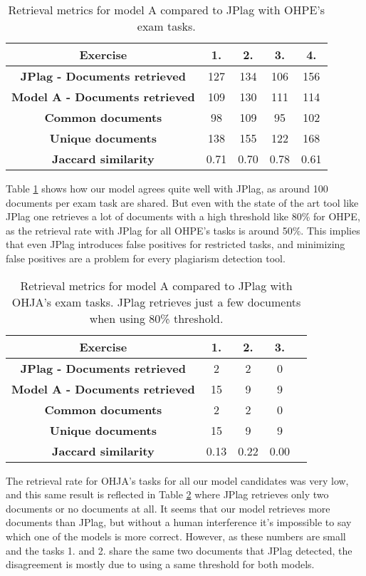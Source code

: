 \begin{table}[ht]
\centering
\caption{Retrieval metrics for model A compared to JPlag with OHPE's exam tasks.}
\begin{tabular}{|c||c|c|c|c|}
\hline
\bf Exercise & 1. & 2. & 3. & 4. \\ \hline
\bf JPlag - Documents retrieved & 127 & 134 & 106 & 156 \\ \hline
\bf Model A - Documents retrieved & 109 & 130 & 111 & 114\\ \hline
\bf Common documents & 98  & 109 & 95 & 102\\ \hline
\bf Unique documents & 138 & 155 & 122 & 168\\ \hline
\bf Jaccard similarity    & 0.71  & 0.70  & 0.78  & 0.61  \\ \hline
\end{tabular}
\label{tbl-jacc-sd-ohpe}
\end{table}

\noindent
Table \ref{tbl-jacc-sd-ohpe} shows how our model agrees quite well with JPlag, as around 100 documents per exam task are shared. But even with the state of the art tool like JPlag one retrieves a lot of documents with a high threshold like 80\% for OHPE, as the retrieval rate with JPlag for all OHPE's tasks is around 50\%. This implies that even JPlag introduces false positives for restricted tasks, and minimizing false positives are a problem for every plagiarism detection tool.   

\begin{table}[ht]
\centering
\caption{Retrieval metrics for model A compared to JPlag with OHJA's exam tasks. JPlag retrieves just a few documents when using 80\% threshold.}
\begin{tabular}{|c||c|c|c|c|}
\hline
\bf Exercise & 1. & 2. & 3. \\ \hline
\bf JPlag - Documents retrieved & 2 & 2 & 0  \\ \hline
\bf Model A - Documents retrieved & 15 & 9 & 9 \\ \hline
\bf Common documents & 2  & 2 & 0\\ \hline
\bf Unique documents & 15 & 9 & 9\\ \hline
\bf Jaccard similarity    & 0.13  & 0.22  & 0.00  \\ \hline
\end{tabular}
\label{tbl-jacc-sd-ohja}
\end{table}

\noindent
The retrieval rate for OHJA's tasks for all our model candidates was very low, and this same result is reflected in Table \ref{tbl-jacc-sd-ohja} where JPlag retrieves only two documents or no documents at all. It seems that our model retrieves more documents than JPlag, but without a human interference it's impossible to say which one of the models is more correct. However, as these numbers are small and the tasks 1. and 2. share the same two documents that JPlag detected, the disagreement is mostly due to using a same threshold for both models.  



